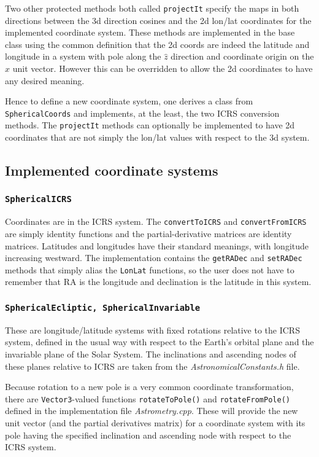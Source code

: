 \documentclass[11pt,preprint,flushrt]{aastex}
\begin{document}
Two other protected methods both called {\tt projectIt} specify the maps in both directions between the 3d direction cosines and the 2d lon/lat coordinates for the implemented coordinate system.  These methods are implemented in the base class using the common definition that the 2d coords are indeed the latitude and longitude in a system with pole along the $\hat z$ direction and coordinate origin on the $\hat x$ unit vector.  However this can be overridden to allow the 2d coordinates to have any desired meaning.

Hence to define a new coordinate system, one derives a class from {\tt SphericalCoords} and implements, at the least, the two ICRS conversion methods.  The {\tt projectIt} methods can optionally be implemented to have 2d coordinates that are not simply the lon/lat values with respect to the 3d system.

\subsection{Implemented coordinate systems}
\subsubsection{{\tt SphericalICRS}}
Coordinates are in the ICRS system.  The {\tt convertToICRS} and {\tt convertFromICRS} are simply identity functions and the partial-derivative matrices are identity matrices.  Latitudes and longitudes have their standard meanings, with longitude increasing westward.  The implementation contains the {\tt getRADec} and {\tt setRADec} methods that simply alias the {\tt LonLat} functions, so the user does not have to remember that RA is the longitude and declination is the latitude in this system.

\subsubsection{\tt SphericalEcliptic, SphericalInvariable}
These are longitude/latitude systems with fixed rotations relative to the ICRS system, defined in the usual way with respect to the Earth's orbital plane and the invariable plane of the Solar System.  The inclinations and ascending nodes of these planes relative to ICRS are taken from the {\it AstronomicalConstants.h} file.

Because rotation to a new pole is a very common coordinate transformation, there are {\tt Vector3}-valued functions {\tt rotateToPole()} and {\tt rotateFromPole()} defined in the implementation file {\it Astrometry.cpp}.  These will provide the new unit vector (and the partial derivatives matrix) for a coordinate system with its pole having the specified inclination and ascending node with respect to the ICRS system.  
\end{document}
